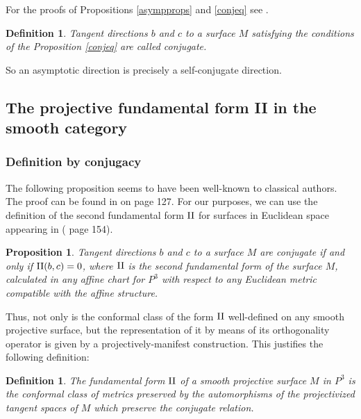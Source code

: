 \documentclass[11pt]{article}
\numberwithin{equation}{section}
\newcounter{count}
\theoremstyle{plain}
\newtheorem{definition}[count]{Definition}
\newtheorem{proposition}[count]{Proposition}
\theoremstyle{remark}
\newcommand{\II}{\textnormal{II}}
\begin{document}
For the proofs of Propositions \ref{asympprops} and \ref{conjeq} see \cite{eisenhardt}.

\begin{definition} Tangent directions $b$ and $c$ to a surface $M$ satisfying the conditions of the Proposition \ref{conjeq} are called \emph{conjugate}.
\end{definition}

So an asymptotic direction is precisely a self-conjugate direction.

\subsection{The projective fundamental form II in the smooth category}\label{projIIform}

\subsubsection{Definition by conjugacy\label{firstIIprojinv}}

The following proposition seems to have been well-known to classical authors. The proof can be found in \cite{eisenhardt} on page 127. For our purposes, we can use the definition of the second fundamental form $\II$ for surfaces in Euclidean space appearing in (\cite{bdocarmo} page 154).


\begin{proposition} Tangent directions $b$ and $c$ to a surface $M$ are conjugate if and only if $\II(b,c)=0$, where $\II$ is the second fundamental form of the surface $M$, calculated in any affine chart for $ P^{3}$ with respect to any Euclidean metric compatible with the affine structure.
\end{proposition}

Thus, not only is the conformal class of the form $\II$ well-defined on any smooth projective surface, but the representation of it by means of its orthogonality operator is given by a projectively-manifest construction. This justifies the following definition:

\begin{definition} The fundamental form $\II$ of a smooth projective surface $M$ in $P^{3}$ is the conformal class of metrics preserved by the automorphisms of the projectivized tangent spaces of $M$ which preserve the conjugate relation.
\end{definition}
\end{document}
